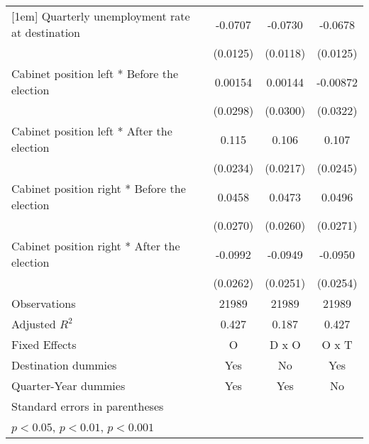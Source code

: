 \begin{table}[htbp]
\begin{tabular}{l*{3}{c}}
[1em]
Quarterly unemployment rate at destination&     -0.0707\sym{***}&     -0.0730\sym{***}&     -0.0678\sym{***}\\
                    &    (0.0125)         &    (0.0118)         &    (0.0125)         \\
[1em]
Cabinet position left * Before the election&     0.00154         &     0.00144         &    -0.00872         \\
                    &    (0.0298)         &    (0.0300)         &    (0.0322)         \\
[1em]
Cabinet position left * After the election&       0.115\sym{***}&       0.106\sym{***}&       0.107\sym{***}\\
                    &    (0.0234)         &    (0.0217)         &    (0.0245)         \\
[1em]
Cabinet position right * Before the election&      0.0458         &      0.0473         &      0.0496         \\
                    &    (0.0270)         &    (0.0260)         &    (0.0271)         \\
[1em]
Cabinet position right * After the election&     -0.0992\sym{***}&     -0.0949\sym{***}&     -0.0950\sym{***}\\
                    &    (0.0262)         &    (0.0251)         &    (0.0254)         \\
\hline
Observations        &       21989         &       21989         &       21989         \\
Adjusted \(R^{2}\)  &       0.427         &       0.187         &       0.427         \\
Fixed Effects       &           O         &       D x O         &       O x T         \\
Destination dummies &         Yes         &          No         &         Yes         \\
Quarter-Year dummies&         Yes         &         Yes         &          No         \\
\hline\hline
\multicolumn{4}{l}{\footnotesize Standard errors in parentheses}\\
\multicolumn{4}{l}{\footnotesize \sym{*} \(p<0.05\), \sym{**} \(p<0.01\), \sym{***} \(p<0.001\)}\\
\end{tabular}
\end{table}
